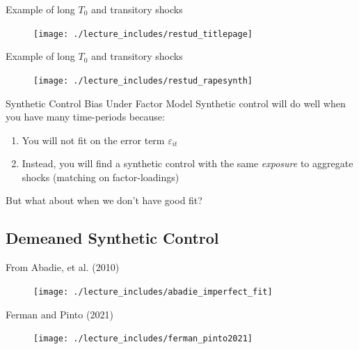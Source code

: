 \documentclass{beamer}
\begin{document}
\begin{frame}{Example of long $T_0$ and transitory shocks}

	\begin{figure}
	\texttt{[image: ./lecture\_includes/restud\_titlepage]}
	\end{figure}

\end{frame}

\begin{frame}{Example of long $T_0$ and transitory shocks}

	\begin{figure}
	\texttt{[image: ./lecture\_includes/restud\_rapesynth]}
	\end{figure}

\end{frame}




\begin{frame}{ Synthetic Control Bias Under Factor Model}
  Synthetic control will do well when you have many time-periods because:
  \begin{enumerate}
    \item You will not fit on the error term $\varepsilon_{it}$ 
    \item Instead, you will find a synthetic control with the same \emph{exposure} to aggregate shocks (matching on factor-loadings)
  \end{enumerate}

  \bigskip
  But what about when we don't have good fit?
\end{frame}

\subsection{Demeaned Synthetic Control}

\begin{frame}{From Abadie, et al. (2010)}

	\begin{figure}
	\texttt{[image: ./lecture\_includes/abadie\_imperfect\_fit]}
	\end{figure}

\end{frame}


\begin{frame}{Ferman and Pinto (2021)}

	\begin{figure}
	\texttt{[image: ./lecture\_includes/ferman\_pinto2021]}
	\end{figure}

\end{frame}
\end{document}
